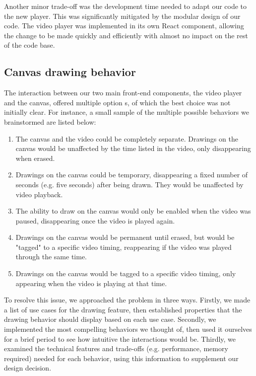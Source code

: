 \documentclass[conference]{IEEEtran}
\begin{document}
  Another minor trade-off was the development time needed to adapt our code to the new player. This was significantly mitigated by the modular design of our code. The video player was implemented in its own React component, allowing the change to be made quickly and efficiently with almost no impact on the rest of the code base.

\subsection{Canvas drawing behavior}

  The interaction between our two main front-end components, the video player and the canvas, offered multiple option
s, of which the best choice was not initially clear. For instance, a small sample of the multiple possible behaviors we brainstormed are listed below:

  \begin{enumerate}
    \item The canvas and the video could be completely separate. Drawings on the canvas would be unaffected by the time listed in the video, only disappearing when erased.

    \item Drawings on the canvas could be temporary, disappearing a fixed number of seconds (e.g. five seconds) after being drawn. They would be unaffected by video playback.

    \item The ability to draw on the canvas would only be enabled when the video was paused, disappearing once the video is played again.

    \item Drawings on the canvas would be permanent until erased, but would be "tagged" to a specific video timing, reappearing if the video was played through the same time.

    \item Drawings on the canvas would be tagged to a specific video timing, only appearing when the video is playing at that time.
  \end{enumerate}

  To resolve this issue, we approached the problem in three ways. Firstly, we made a list of use cases for the drawing feature, then established properties that the drawing behavior should display based on each use case. Secondly, we implemented the most compelling behaviors we thought of, then used it ourselves for a brief period to see how intuitive the interactions would be. Thirdly, we examined the technical features and trade-offs (e.g. performance, memory required) needed for each behavior, using this information to supplement our design decision.
\end{document}

